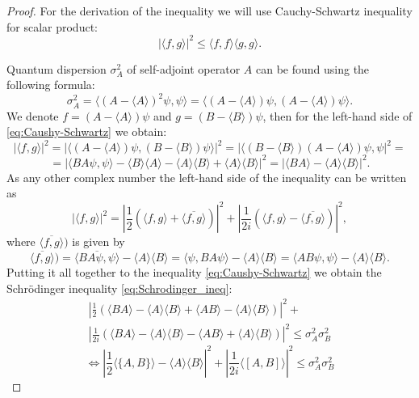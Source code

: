 \documentclass[%
master,         %
subf,           %
href,           %
colorlinks=true %
]{disser}
\numberwithin{equation}{section}
\numberwithin{figure}{section}
\begin{document}
\begin{proof}
For the derivation of the inequality we will use Cauchy-Schwartz inequality for scalar product:
\begin{equation}
|\langle f, g\rangle |^2 \leq \langle f, f\rangle \langle g, g\rangle. \label{eq:Caushy-Schwartz}
\end{equation}

Quantum dispersion $\sigma^2_A$ of self-adjoint operator $A$ can be found using the following formula:
\[
\sigma_A^2 = \langle (A - \langle A\rangle)^2\psi, \psi\rangle = \langle  (A - \langle A\rangle)\psi,  (A - \langle A\rangle)\psi\rangle.
\]
We denote $f = (A - \langle A\rangle)\psi$ and $g = (B - \langle B\rangle)\psi$, then for the left-hand side of \eqref{eq:Caushy-Schwartz} we obtain:
\[
|\langle f, g\rangle |^2 = |\langle (A - \langle A\rangle)\psi, (B - \langle B\rangle)\psi\rangle |^2 = |\langle (B - \langle B\rangle)(A - \langle A\rangle)\psi, \psi |^2 = 
\]
\[
= | \langle BA\psi, \psi\rangle - \langle B\rangle\langle A\rangle - \langle A\rangle \langle B\rangle + \langle A\rangle\langle B\rangle |^2 = | \langle BA\rangle - \langle A\rangle\langle B\rangle |^2.
\]
As any other complex number the left-hand side of the inequality can be written as
\[
|\langle f, g\rangle |^2 = \left| \frac{1}{2}(\langle f, g\rangle + \overline{\langle f, g\rangle})\right|^2 + \left| \frac{1}{2i}(\langle f, g\rangle - \overline{\langle f, g\rangle})\right|^2, 
\]
where $\overline{\langle f, g\rangle})$ is given by
\[
\overline{\langle f, g\rangle}) = \overline{\langle BA\psi, \psi\rangle} - \langle A\rangle\langle B\rangle = \langle\psi, BA\psi\rangle - \langle A\rangle\langle B\rangle = \langle AB\psi, \psi\rangle - \langle A\rangle\langle B\rangle.
\]
Putting it all together to the inequality \eqref{eq:Caushy-Schwartz} we obtain the Schr\"{o}dinger inequality \eqref{eq:Schrodinger_ineq}:
\begin{multline*}
\left| \frac{1}{2}(\langle BA\rangle - \langle A\rangle\langle B\rangle + \langle AB\rangle - \langle A\rangle\langle B\rangle)\right|^2 + \\
\left| \frac{1}{2i}(\langle BA\rangle - \langle A\rangle\langle B\rangle - \langle AB\rangle + \langle A\rangle\langle B\rangle)\right|^2 \leq \sigma_A^2\sigma_B^2
\end{multline*}
\[
\Leftrightarrow \left| \frac{1}{2}\langle\{A, B\}\rangle - \langle A\rangle\langle B\rangle \right|^2 + \left| \frac{1}{2i}\langle [A, B]\rangle\right|^2 \leq \sigma_A^2\sigma_B^2
\]
\end{proof}
\end{document}
